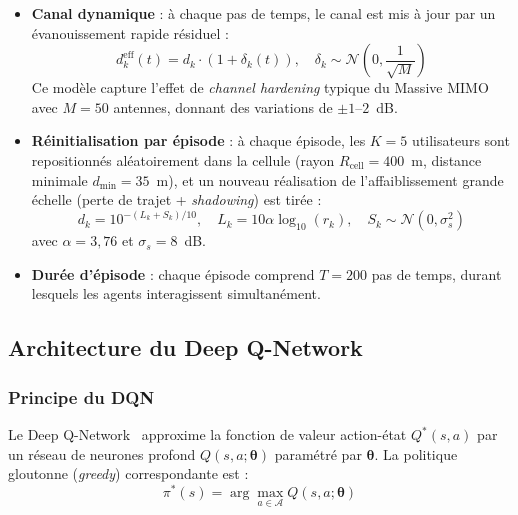 \documentclass[conference]{IEEEtran}
\begin{document}
\begin{itemize}
    \item \textbf{Canal dynamique} : à chaque pas de temps, le canal est mis à jour par un évanouissement rapide résiduel :
    \begin{equation}
        d_k^{\text{eff}}(t) = d_k \cdot (1 + \delta_k(t)), \quad \delta_k \sim \mathcal{N}\!\left(0, \frac{1}{\sqrt{M}}\right)
        \label{eq:channel_hardening}
    \end{equation}
    Ce modèle capture l'effet de \textit{channel hardening} typique du Massive MIMO avec $M = 50$ antennes, donnant des variations de $\pm 1$--$2$~dB.

    \item \textbf{Réinitialisation par épisode} : à chaque épisode, les $K = 5$ utilisateurs sont repositionnés aléatoirement dans la cellule (rayon $R_{\text{cell}} = 400$~m, distance minimale $d_{\min} = 35$~m), et un nouveau réalisation de l'affaiblissement grande échelle (perte de trajet + \textit{shadowing}) est tirée :
    \begin{equation}
        d_k = 10^{-(L_k + S_k)/10}, \quad L_k = 10\alpha\log_{10}(r_k), \quad S_k \sim \mathcal{N}(0, \sigma_s^2)
        \label{eq:large_scale_fading}
    \end{equation}
    avec $\alpha = 3{,}76$ et $\sigma_s = 8$~dB.

    \item \textbf{Durée d'épisode} : chaque épisode comprend $T = 200$ pas de temps, durant lesquels les agents interagissent simultanément.
\end{itemize}

\subsection{Architecture du Deep Q-Network}
\label{sec:dqn_architecture}

\subsubsection{Principe du DQN}

Le Deep Q-Network~\cite{mnih2015} approxime la fonction de valeur action-état $Q^*(s, a)$ par un réseau de neurones profond $Q(s, a; \boldsymbol{\theta})$ paramétré par $\boldsymbol{\theta}$. La politique gloutonne (\textit{greedy}) correspondante est :
\begin{equation}
    \pi^*(s) = \arg\max_{a \in \mathcal{A}} Q(s, a; \boldsymbol{\theta})
    \label{eq:greedy_policy}
\end{equation}
\end{document}
